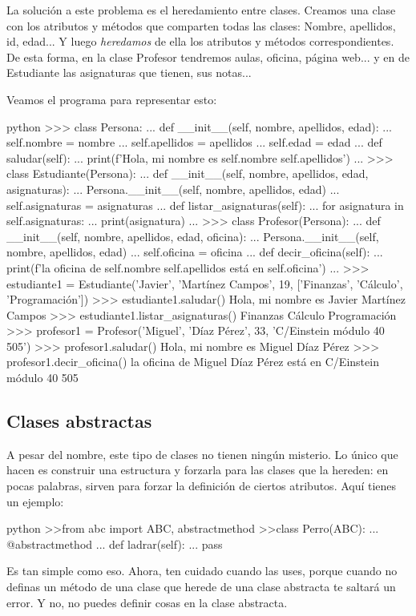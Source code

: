 \documentclass{article}
\begin{document}
La solución a este problema es el heredamiento entre clases. Creamos una clase con los atributos y métodos que comparten todas las clases: Nombre, apellidos, id, edad... Y luego \textit{heredamos} de ella los atributos y métodos correspondientes. De esta forma, en la clase Profesor tendremos aulas, oficina, página web... y en de Estudiante las asignaturas que tienen, sus notas...

Veamos el programa para representar esto:
\newpage
\begin{mintedbox}{python}
>>> class Persona:
...     def __init__(self, nombre, apellidos, edad):
...             self.nombre = nombre
...             self.apellidos = apellidos
...             self.edad = edad
...     def saludar(self):
...             print(f'Hola, mi nombre es {self.nombre} {self.apellidos}')
...
>>> class Estudiante(Persona):
...     def __init__(self, nombre, apellidos, edad, asignaturas):
...             Persona.__init__(self, nombre, apellidos, edad)
...             self.asignaturas = asignaturas
...     def listar_asignaturas(self):
...             for asignatura in self.asignaturas:
...                     print(asignatura)
...
>>> class Profesor(Persona):
...     def __init__(self, nombre, apellidos, edad, oficina):
...             Persona.__init__(self, nombre, apellidos, edad)
...             self.oficina = oficina
...     def decir_oficina(self):
...             print(f'la oficina de {self.nombre} {self.apellidos} está en {self.oficina}')
...
>>> estudiante1 = Estudiante('Javier', 'Martínez Campos', 19, ['Finanzas', 'Cálculo', 'Programación'])
>>> estudiante1.saludar()
Hola, mi nombre es Javier Martínez Campos
>>> estudiante1.listar_asignaturas()
Finanzas
Cálculo
Programación
>>> profesor1 = Profesor('Miguel', 'Díaz Pérez', 33, 'C/Einstein módulo 40 505')
>>> profesor1.saludar()
Hola, mi nombre es Miguel Díaz Pérez
>>> profesor1.decir_oficina()
la oficina de Miguel Díaz Pérez está en C/Einstein módulo 40 505
\end{mintedbox}
\subsection{Clases abstractas}
A pesar del nombre, este tipo de clases no tienen ningún misterio. Lo único que hacen es construir una estructura y forzarla para las clases que la hereden: en pocas palabras, sirven para forzar la definición de ciertos atributos. Aquí tienes un ejemplo:
\begin{mintedbox}{python}
>>from abc import ABC, abstractmethod
>>class Perro(ABC):
...  @abstractmethod
...  def ladrar(self):
...        pass
\end{mintedbox}
Es tan simple como eso. Ahora, ten cuidado cuando las uses, porque cuando no definas un método de una clase que herede de una clase abstracta te saltará un error. Y no, no puedes definir cosas en la clase abstracta.
\end{document}
